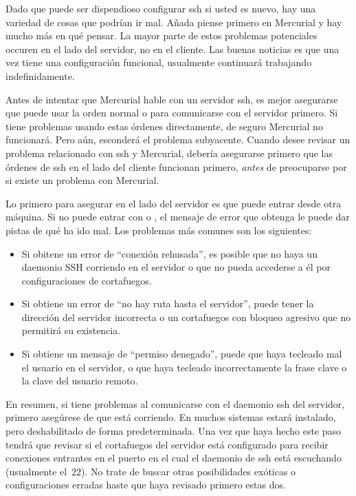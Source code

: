 Dado que puede ser dispendioso configurar ssh si usted es nuevo, hay 
una variedad de cosas que podrían ir mal.  Añada piense primero en
Mercurial y hay mucho más en qué pensar.  La mayor parte de estos
problemas potenciales occuren en el lado del servidor, no en el cliente.
Las buenas noticias es que una vez tiene una configuración funcional,
usualmente continuará trabajando indefinidamente.

Antes de intentar que Mercurial hable con un servidor ssh, es mejor
asegurarse que puede usar la orden normal  o 
para comunicarse con el servidor primero.  Si tiene problemas usando
estas órdenes directamente, de seguro Mercurial no funcionará.  Pero aún,
esconderá el problema subyacente.  Cuando desee revisar un problema
relacionado con ssh y Mercurial, debería asegurarse primero que las
órdenes de ssh en el lado del cliente funcionan primero, \emph{antes}
de preocuparse por si existe un problema con Mercurial.

Lo primero para asegurar en el lado del servidor es que puede entrar
desde otra máquina.  Si no puede entrar con  o 
, el mensaje de error que obtenga le puede dar pistas
de qué ha ido mal.  Los problemas más comunes son los siguientes:
\begin{itemize}
\item Si obitene un error de ``conexión rehusada'', es posible que no 
  haya un daemonio SSH corriendo en el servidor o que no pueda accederse
  a él por configuraciones de cortafuegos.
\item Si obtiene un error de ``no hay ruta hasta el servidor'', puede
  tener la dirección del servidor incorrecta o un cortafuegos con
  bloqueo agresivo que no permitirá su existencia.
\item Si obtiene un mensaje de ``permiso denegado'', puede que haya
  tecleado mal el usuario en el servidor, o que haya tecleado
  incorrectamente la frase clave o la clave del usuario remoto.
\end{itemize}
En resumen, si tiene problemas al comunicarse con el daemonio ssh del
servidor, primero asegúrese de que está corriendo.  En muchos sistemas
estará instalado, pero deshabilitado de forma predeterminada.  Una vez
que haya hecho este paso tendrá que revisar si el cortafuegos del
servidor está configurado para recibir conexiones entrantes en el
puerto en el cual el daemonio de ssh está escuchando (usualmente el~22).
No trate de buscar otras posibilidades exóticas o configuraciones
erradas haste que haya revisado primero estas dos.

